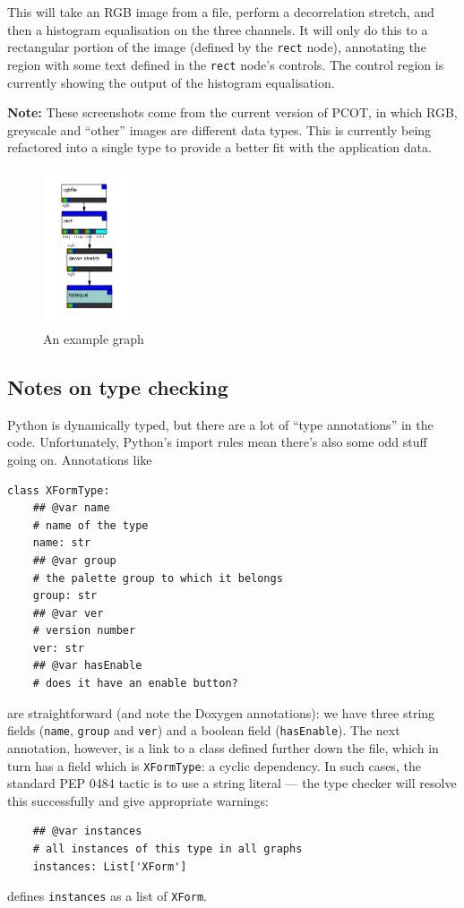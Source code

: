 \clearpage
This will take an RGB image from a file, perform a decorrelation stretch,
and then a histogram equalisation on the three channels. It will
only do this to a rectangular portion of the image (defined by the
\texttt{rect} node), annotating the region with some text defined in
the \texttt{rect} node's controls. The control region is currently
showing the output of the histogram equalisation.

\begin{notebox}
\textbf{Note:} These screenshots come from the current version of
PCOT, in which RGB, greyscale and ``other'' images are different
data types. This is currently being refactored into a single type
to provide a better fit with the application data.
\end{notebox}

\begin{figure}[ht]
\center
\includegraphics[width=1in]{graph.png}
\caption{An example graph}
\label{graph.png}
\end{figure}


\subsection{Notes on type checking}
Python is dynamically typed, but there are a lot of ``type annotations''
in the code. Unfortunately, Python's import rules mean there's also some
odd stuff going on. Annotations like
\begin{lstlisting}
class XFormType:
    ## @var name
    # name of the type
    name: str
    ## @var group
    # the palette group to which it belongs
    group: str
    ## @var ver
    # version number
    ver: str
    ## @var hasEnable
    # does it have an enable button?
\end{lstlisting}
are straightforward (and note the Doxygen annotations): we have three
string fields (\texttt{name}, \texttt{group} and \texttt{ver}) and
a boolean field (\texttt{hasEnable}). The next annotation, however,
is a link to a class defined further down the file, which in turn has
a field which is \texttt{XFormType}: a cyclic dependency. In such cases,
the standard PEP 0484 tactic is to use a string literal --- the type
checker will resolve this successfully and give appropriate warnings:
\begin{lstlisting}
    ## @var instances
    # all instances of this type in all graphs
    instances: List['XForm']
\end{lstlisting}
defines \texttt{instances} as a list of \texttt{XForm}.

